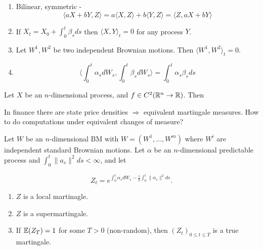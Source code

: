 \begin{proposition}
  \begin{enumerate}
  \item Bilinear, symmetric -
    \begin{equation}
      \label{eq:45}
      \langle aX + bY, Z \rangle = a \langle X, Z \rangle + b \langle
      Y, Z \rangle = \langle Z, aX + bY \rangle
    \end{equation}
  \item If $X_{t} = X_{0} + \int_{0}^{t} \beta_{s} ds$ then $\langle
    X, Y \rangle_{t} = 0$ for any \ito process $Y$.
  \item Let $W^{1}, W^{2}$ be two independent Brownian motions.  Then
    $\langle W^{1}, W^{2} \rangle_{t} = 0$.
  \item
    \begin{equation}
      \label{eq:46}
      \langle \int_{0}^{t} \alpha_{s} dW_{s}, \int_{0}^{t} \beta_{s}
      dW_{s} \rangle = \int_{0}^{t} \alpha_{s} \beta_{s} ds
    \end{equation}
  \end{enumerate}
\end{proposition}

Let $X$ be an $n$-dimensional \ito process, and $f \in C^{2}(\mathbb{R}^{n}
\rightarrow \mathbb{R})$.  Then
\begin{equation}
  \label{eq:47}
\end{equation}


In finance there are state price densities $\Rightarrow$ equivalent
martingale measures.  How to do computations under equivalent changes
of measure?

Let $W$ be an $n$-dimensional BM with $W = (W^{1}, \dots, W^{m})$
where $W^{i}$ are independent standard Brownian motions.  Let $\alpha$
be an $n$-dimensional predictable process and $\int_{0}^{t} \| a_{s}
\|^{2} ds < \infty$, and let

\begin{equation}
  \label{eq:48}
  Z_{t} = e^{\int_{0}^{t} \alpha_{s}
    dW_{s} - \frac{1}{2} \int_{0}^{t} \| \alpha_{s} \|^{2} ds}.
\end{equation}

\begin{proposition}
  \begin{enumerate}
  \item $Z$ is a local martinagle.
  \item $Z$ is a supermartingale.
  \item If $\E{Z_{T}} = 1$ for some $T > 0$ (non-random), then
    $(Z_{t})_{0 \leq t \leq T}$ is a true martingale.
  \end{enumerate}
\end{proposition}

